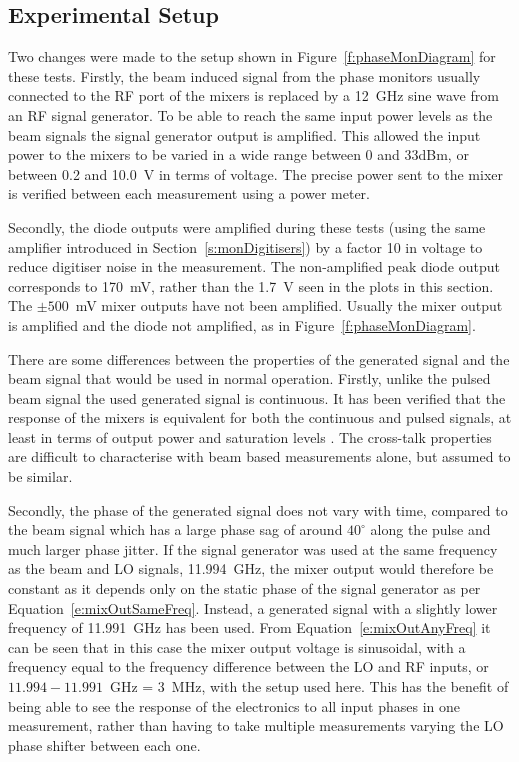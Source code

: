 \subsection{Experimental Setup}
\label{ss:sigGenSetup}

Two changes were made to the setup shown in Figure~\ref{f:phaseMonDiagram} for these tests. Firstly, the beam induced signal from the phase monitors usually connected to the RF port of the mixers is replaced by a 12~GHz sine wave from an RF signal generator. To be able to reach the same input power levels as the beam signals the signal generator output is amplified. This allowed the input power to the mixers to be varied in a wide range between 0 and 33dBm, or between 0.2 and 10.0~V in terms of voltage. The precise power sent to the mixer is verified between each measurement using a power meter. 

Secondly, the diode outputs were amplified during these tests (using the same amplifier introduced in Section~\ref{s:monDigitisers}) by a factor 10 in voltage to reduce digitiser noise in the measurement. The non-amplified peak diode output corresponds to 170~mV, rather than the 1.7~V seen in the plots in this section. The \(\pm500\)~mV mixer outputs have not been amplified. Usually the mixer output is amplified and the diode not amplified, as in Figure~\ref{f:phaseMonDiagram}.

There are some differences between the properties of the generated signal and the beam signal that would be used in normal operation. Firstly, unlike the pulsed beam signal the used generated signal is continuous. It has been verified that the response of the mixers is equivalent for both the continuous and pulsed signals, at least in terms of output power and saturation levels \cite{jackFONTOct15}. The cross-talk properties are difficult to characterise with beam based measurements alone, but assumed to be similar.

Secondly, the phase of the generated signal does not vary with time, compared to the beam signal which has a large phase sag of around \(40^\circ\)  along the pulse and much larger phase jitter. If the signal generator was used at the same frequency as the beam and LO signals, 11.994~GHz, the mixer output would therefore be constant as it depends only on the static phase of the signal generator as per Equation~\ref{e:mixOutSameFreq}. Instead, a generated signal with a slightly lower frequency of 11.991~GHz has been used. From Equation~\ref{e:mixOutAnyFreq} it can be seen that in this case the mixer output voltage is sinusoidal, with a frequency equal to the frequency difference between the LO and RF inputs, or \(11.994-11.991\)~GHz = 3~MHz, with the setup used here. This has the benefit of being able to see the response of the electronics to all input phases in one measurement, rather than having to take multiple measurements varying the LO phase shifter between each one.

